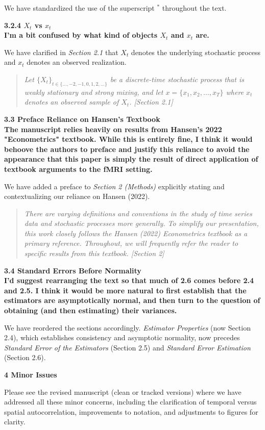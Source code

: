 \documentclass[docs/main.tex]{subfiles}
\newcommand{\reviewercomment}[1]{\vspace{0.3cm}\noindent\textbf{#1}\vspace{0.15cm}}
\newcommand{\manuscriptquote}[1]{\begin{quote}\textit{#1}\end{quote}}
\begin{document}
We have standardized the use of the superscript $^\ast$ throughout the text.

\reviewercomment{3.2.4 $X_t$ vs $x_t$\\
I’m a bit confused by what kind of objects $X_t$ and $x_t$ are.}

We have clarified in \textit{Section 2.1} that $X_t$ denotes the underlying stochastic process and $x_t$ denotes an observed realization.

\manuscriptquote{Let $\{X_t\}_{t\in\{\dots, -2, -1, 0, 1, 2, \dots\}}$ be a discrete-time stochastic process that is weakly stationary and strong mixing, and let $x = \{x_1, x_2, \ldots, x_T\}$ where $x_t$ denotes an observed sample of $X_t$. [Section 2.1]}

\reviewercomment{3.3 Preface Reliance on Hansen’s Textbook\\
The manuscript relies heavily on results from Hansen’s 2022 "Econometrics" textbook. While this is entirely fine, I think it would behoove the authors to preface and justify this reliance to avoid the appearance that this paper is simply the result of direct application of textbook arguments to the fMRI setting.}

We have added a preface to \textit{Section 2 (Methods)} explicitly stating and contextualizing our reliance on Hansen (2022).

\manuscriptquote{There are varying definitions and conventions in the study of time series data and stochastic processes more generally. To simplify our presentation, this work closely follows the Hansen (2022) \textit{Econometrics} textbook as a primary reference. Throughout, we will frequently refer the reader to specific results from this textbook. [Section 2]}

\reviewercomment{3.4 Standard Errors Before Normality\\
I’d suggest rearranging the text so that much of 2.6 comes before 2.4 and 2.5. I think it would be more natural to first establish that the estimators are asymptotically normal, and then turn to the question of obtaining (and then estimating) their variances.}

We have reordered the sections accordingly. \textit{Estimator Properties} (now Section 2.4), which establishes consistency and asymptotic normality, now precedes \textit{Standard Error of the Estimators} (Section 2.5) and \textit{Standard Error Estimation} (Section 2.6).

\reviewercomment{4 Minor Issues}

Please see the revised manuscript (clean or tracked versions) where we have addressed all these minor concerns, including the clarification of temporal versus spatial autocorrelation, improvements to notation, and adjustments to figures for clarity.
\end{document}
